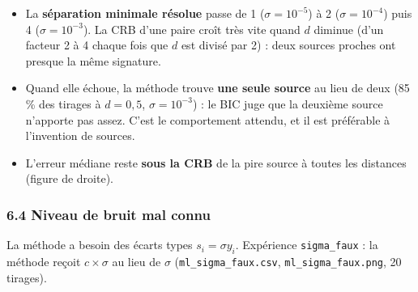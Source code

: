 \documentclass[
  french,
]{article}
\providecommand{\tightlist}{%
  \setlength{\itemsep}{0pt}\setlength{\parskip}{0pt}}
\begin{document}
\begin{itemize}
\tightlist
\item
  La \textbf{séparation minimale résolue} passe de 1
  (\(\sigma = 10^{-5}\)) à 2 (\(\sigma = 10^{-4}\)) puis 4
  (\(\sigma = 10^{-3}\)). La CRB d'une paire croît très vite quand \(d\)
  diminue (d'un facteur 2 à 4 chaque fois que \(d\) est divisé par 2) :
  deux sources proches ont presque la même signature.
\item
  Quand elle échoue, la méthode trouve \textbf{une seule source} au lieu
  de deux (85 \% des tirages à \(d = 0{,}5\), \(\sigma = 10^{-3}\)) : le
  BIC juge que la deuxième source n'apporte pas assez. C'est le
  comportement attendu, et il est préférable à l'invention de sources.
\item
  L'erreur médiane reste \textbf{sous la CRB} de la pire source à toutes
  les distances (figure de droite).
\end{itemize}

\subsubsection{6.4 Niveau de bruit mal
connu}\label{niveau-de-bruit-mal-connu}

La méthode a besoin des écarts types \(s_i = \sigma y_i\). Expérience
\texttt{sigma\_faux} : la méthode reçoit \(c\times\sigma\) au lieu de
\(\sigma\) (\texttt{ml\_sigma\_faux.csv}, \texttt{ml\_sigma\_faux.png},
20 tirages).
\end{document}
